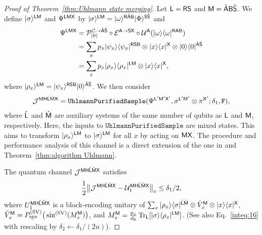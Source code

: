 \begin{proof}[Proof of Theorem~\ref{thm:Uhlmann state merging}]
    


Let $\sL = \sR\sS$ and $\sM = \hat{\sA}\sB\hat{\sS}$. 
We define $\ket{\sigma}^{\sL\sM}$ and $\Psi^{\sL\sM\sX}$ by $\ket{\sigma}^{\sL\sM} = \ket{\omega}^{\sR\hat{\sA}\sB}\ket{\Phi}^{\sS\hat{\sS}}$ and 
\begin{align}
    \Psi^{\sL\sM\sX} 
    &= \cP_{\ket{0}}^{\bC\rarr\hat{\sA}\hat{\sS}} \circ \cE^{\sA\rarr\sS\sX}\circ\cU^\sA(\ketbra{\omega}{\omega}^{\sR\sA\sB}) \\
    &= \sum_x  p_x\ketbra{\psi_x}{\psi_x}^{\sR\sS\sB} \otimes \ketbra{x}{x}^{\sX} \otimes \ketbra{0}{0}^{\hat{\sA}\hat{\sS}} \\
    &= \sum_x  p_x\ketbra{\rho_x}{\rho_x}^{\sL\sM} \otimes \ketbra{x}{x}^{\sX},
\end{align}
where $\ket{\rho_x}^{\sL\sM} = \ket{\psi_x}^{\sR\sS\sB}\ket{0}^{\hat{\sA}\hat{\sS}}$.
We then consider 
\begin{align}
    \cJ^{\sM\sH\hat{\sL}\hat{\sM}\sX} 
    = \mathtt{UhlmannPurifiedSample}(\Psi^{\sL'\sM'\sX'}, \sigma^{\sL'\sM'}\otimes\pi^{\sX'}; \delta_1, \tF),
\end{align}
where $\hat{\sL}$ and $\hat{\sM}$ are auxiliary systems of the same number of qubits as $\sL$ and $\sM$, respectively. 
Here, the inputs to $\mathtt{UhlmannPurifiedSample}$ are mixed states. This aims to transform $\ket{\rho_x}^{\sL\sM}$ to $\ket{\sigma}^{\sL\sM}$ for all $x$ by acting on $\sM\sX$.
The procedure and performance analysis of this channel is a direct extension of the one in  and Theorem~\ref{thm:algorithm Uhlmann}.


The quantum channel $\cJ^{\sM\sH\hat{\sL}\hat{\sM}\sX}$ satisfies 
\begin{align}
\label{inteq:133}
    \f{1}{2}\big\|\cJ^{\sM\sH\hat{\sL}\hat{\sM}\sX} - \cU_1^{\sM\sH\hat{\sL}\hat{\sM}\sX}\big\|_\diamond \leq \delta_1/2,
\end{align}
where $U_1^{\sM\sH\hat{\sL}\hat{\sM}\sX}$ is a block-encoding unitary of $\sum_x \ketbra{\rho_x}{\sigma}^{\hat{\sL}\hat{\sM}} \otimes \til{V}_x^\sM \otimes \ketbra{x}{x}^\sX$, $\til{V}_x^\sM = P_\sgn^{(\rm SV)}\big(\sin^{(\rm SV)}(M_x^\sM)\big)$, and $M_x^\sM = \f{p_x}{d_\sX} \tr_\sL[\ket{\sigma}\bra{\rho_x}^{\sL\sM}]$. (See also Eq.~\eqref{inteq:16} with rescaling by $\delta_2 \gets \delta_1/(2u)$).



\end{proof}
